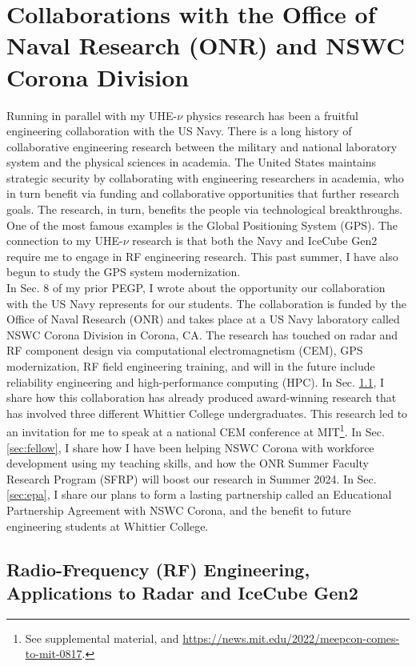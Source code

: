 \documentclass[../../../main.tex]{subfiles}
\begin{document}
\section{Collaborations with the Office of Naval Research (ONR) and NSWC Corona Division}
\label{sec:naval_research}

Running in parallel with my UHE-$\nu$ physics research has been a fruitful engineering collaboration with the US Navy.  There is a long history of collaborative engineering research between the military and national laboratory system and the physical sciences in academia.  The United States maintains strategic security by collaborating with engineering researchers in academia, who in turn benefit via funding and collaborative opportunities that further research goals.  The research, in turn, benefits the people via technological breakthroughs.  One of the most famous examples is the Global Positioning System (GPS).  The connection to my UHE-$\nu$ research is that both the Navy and IceCube Gen2 require me to engage in RF engineering research.  This past summer, I have also begun to study the GPS system modernization.
\\
\vspace{0.25cm}
In Sec. 8 of my prior PEGP, I wrote about the opportunity our collaboration with the US Navy represents for our students.  The collaboration is funded by the Office of Naval Research (ONR) and takes place at a US Navy laboratory called NSWC Corona Division in Corona, CA.  The research has touched on radar and RF component design via computational electromagnetism (CEM), GPS modernization, RF field engineering training, and will in the future include reliability engineering and high-performance computing (HPC).  In Sec. \ref{sec:cem_paper}, I share how this collaboration has already produced award-winning research that has involved three different Whittier College undergraduates.  This research led to an invitation for me to speak at a national CEM conference at MIT\footnote{See supplemental material, and \url{https://news.mit.edu/2022/meepcon-comes-to-mit-0817}.}.  In Sec. \ref{sec:fellow}, I share how I have been helping NSWC Corona with workforce development using my teaching skills, and how the ONR Summer Faculty Research Program (SFRP) will boost our research in Summer 2024.  In Sec. \ref{sec:epa}, I share our plans to form a lasting partnership called an Educational Partnership Agreement with NSWC Corona, and the benefit to future engineering students at Whittier College.

\subsection{Radio-Frequency (RF) Engineering, Applications to Radar and IceCube Gen2}
\label{sec:cem_paper}
\end{document}
